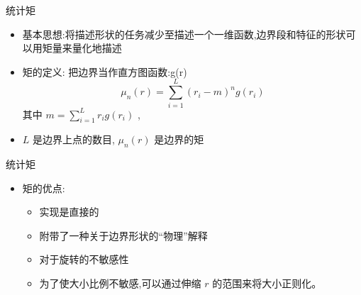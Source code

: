 \documentclass[presentation]{beamer}
\begin{document}
\begin{frame}[label={sec:orgda9cae1}]{统计矩}
\begin{itemize}
\item 基本思想:将描述形状的任务减少至描述一个一维函数,边界段和特征的形状可以用矩量来量化地描述
\item 矩的定义: 把边界当作直方图函数:g(r)
 \[\mu_n(r) = \sum_{i=1}^L(r_i-m)^ng(r_i)\]
其中 
   \(m=\sum_{i=1}^L r_i g(r_i)\) ,
\item \(L\) 是边界上点的数目, \(\mu_n(r)\) 是边界的矩
\end{itemize}
\end{frame}

\begin{frame}[label={sec:org8f62f54}]{统计矩}
\begin{itemize}
\item 矩的优点:
\begin{itemize}
\item 实现是直接的
\item 附带了一种关于边界形状的“物理”解释
\item 对于旋转的不敏感性
\item 为了使大小比例不敏感,可以通过伸缩 \(r\) 的范围来将大小正则化。
\end{itemize}
\end{itemize}
\end{frame}
\end{document}
